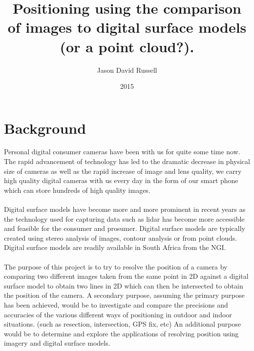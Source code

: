 \documentclass{article}
\title{Positioning using the comparison of images to digital surface models (or a point cloud?).}
\date{2015}
\author{Jason David Russell}
\begin{document}
\maketitle
{}

\newpage
\tableofcontents

\newpage
{}

\section{Background}
\paragraph{}
Personal digital consumer cameras have been with us for quite some time now. The rapid advancement of technology has led to the dramatic decrease in physical size of cameras as well as the rapid increase of image and lens quality, we carry high quality digital cameras with us every day in the form of our smart phone which can store hundreds of high quality images.

\paragraph{}
Digital surface models have become more and more prominent in recent years as the technology used for capturing data such as lidar has become more accessible and feasible for the consumer and prosumer. Digital surface models are typically created using stereo analysis of images, contour analysis or from point clouds. Digital surface models are readily available in South Africa from the NGI.

\paragraph{}
The purpose of this project is to try to resolve the position of a camera by comparing two different images taken from the same point in 2D against a digital surface model to obtain two lines in 2D which can then be intersected to obtain the position of the camera. A secondary purpose, assuming the primary purpose has been achieved, would be to investigate and compare the precisions and accuracies of the various different ways of positioning in outdoor and indoor situations. (such as resection, intersection, GPS fix, etc) An additional purpose would be to determine and explore the applications of resolving position using imagery and digital surface models.
\end{document}

